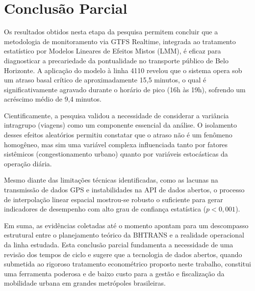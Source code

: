 \section{Conclusão Parcial}

Os resultados obtidos nesta etapa da pesquisa permitem concluir que a metodologia de monitoramento via GTFS Realtime, integrada ao tratamento estatístico por Modelos Lineares de Efeitos Mistos (LMM), é eficaz para diagnosticar a precariedade da pontualidade no transporte público de Belo Horizonte. A aplicação do modelo à linha 4110 revelou que o sistema opera sob um atraso basal crítico de aproximadamente 15,5 minutos, o qual é significativamente agravado durante o horário de pico (16h às 19h), sofrendo um acréscimo médio de 9,4 minutos.

Cientificamente, a pesquisa validou a necessidade de considerar a variância intragrupo (viagens) como um componente essencial da análise. O isolamento desses efeitos aleatórios permitiu constatar que o atraso não é um fenômeno homogêneo, mas sim uma variável complexa influenciada tanto por fatores sistêmicos (congestionamento urbano) quanto por variáveis estocásticas da operação diária.

Mesmo diante das limitações técnicas identificadas, como as lacunas na transmissão de dados GPS e instabilidades na API de dados abertos, o processo de interpolação linear espacial mostrou-se robusto o suficiente para gerar indicadores de desempenho com alto grau de confiança estatística ($p < 0,001$).

Em suma, as evidências coletadas até o momento apontam para um descompasso estrutural entre o planejamento teórico da BHTRANS e a realidade operacional da linha estudada. Esta conclusão parcial fundamenta a necessidade de uma revisão dos tempos de ciclo e sugere que a tecnologia de dados abertos, quando submetida ao rigoroso tratamento econométrico proposto neste trabalho, constitui uma ferramenta poderosa e de baixo custo para a gestão e fiscalização da mobilidade urbana em grandes metrópoles brasileiras.